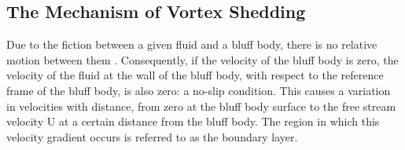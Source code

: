 \subsection{The Mechanism of Vortex Shedding}
Due to the fiction between a given fluid and a bluff body, there is no relative motion between them \parencite{boundaryLayerTheory_2018, jeff_defoe_bluff_2020}. Consequently, if the velocity of the bluff body is zero, the velocity of the fluid at the wall of the bluff body, with respect to the reference frame of the bluff body, is also zero: a no-slip condition. This causes a variation in velocities with distance, from zero at the bluff body surface to the free stream velocity U at a certain distance from the bluff body. The region in which this velocity gradient occurs is referred to as the boundary layer.


